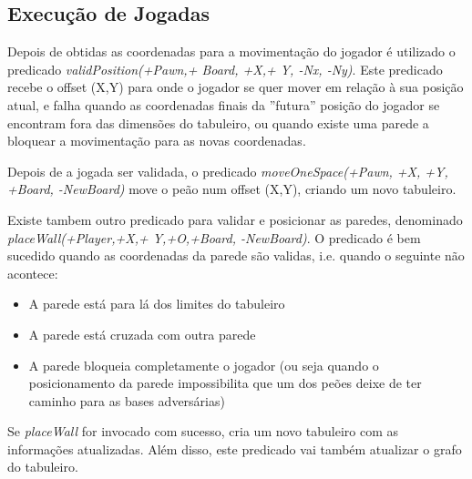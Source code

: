 \documentclass[a4paper]{article}
\begin{document}
\newpage
\subsection{Execução de Jogadas} 

Depois de obtidas as coordenadas para a movimentação do jogador é utilizado o predicado \textit{validPosition(+Pawn,+ Board, +X,+ Y, -Nx, -Ny)}. Este predicado recebe o offset (X,Y) para onde o jogador se quer mover em relação à sua posição atual, e falha quando as coordenadas finais da ''futura'' posição do jogador se encontram fora das dimensões do tabuleiro, ou quando existe uma parede a bloquear a movimentação para as novas coordenadas.
\par Depois de a jogada ser validada, o predicado \textit{moveOneSpace(+Pawn, +X, +Y, +Board, -NewBoard)} move o peão num offset (X,Y), criando um novo tabuleiro.
\par Existe tambem outro predicado para validar e posicionar as paredes, denominado \textit{placeWall(+Player,+X,+ Y,+O,+Board, -NewBoard)}. O predicado é bem sucedido quando as coordenadas da parede são validas, i.e. quando o seguinte não acontece:
\begin{itemize}
	\item A parede está para lá dos limites do tabuleiro
	\item A parede está cruzada com outra parede
	\item A parede bloqueia completamente o jogador (ou seja quando o posicionamento da parede impossibilita que um dos peões deixe de ter caminho para as bases adversárias)
\end{itemize}
Se \textit{placeWall} for invocado com sucesso, cria um novo tabuleiro com as informações atualizadas. Além disso, este predicado vai também atualizar o grafo do tabuleiro.
\end{document}
